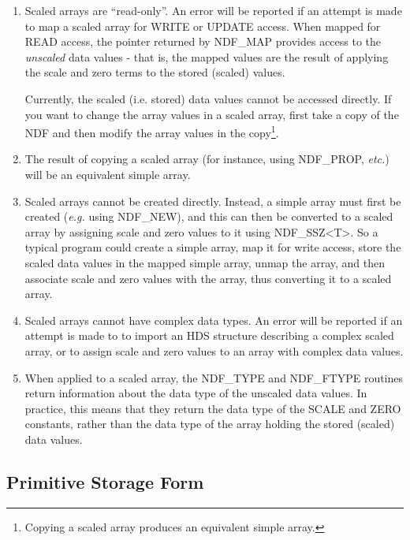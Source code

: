 \begin{enumerate}

\item Scaled arrays are ``read-only''. An error will be reported if an
attempt is made to map a scaled array for WRITE or UPDATE access. When
mapped for READ access, the pointer returned by NDF\_MAP provides access
to the \emph{unscaled} data values - that is, the mapped values are the
result of applying the scale and zero terms to the stored (scaled) values.

Currently, the scaled (i.e. stored) data values cannot be accessed
directly. If you want to change the array values in a scaled array, first
take a copy of the NDF and then modify the array values in the
copy\footnote{Copying a scaled array produces an equivalent simple
array.}.

\item The result of copying a scaled array (for instance, using
NDF\_PROP, \emph{etc.}) will be an equivalent simple array.

\item Scaled arrays cannot be created directly. Instead, a simple array
must first be created (\emph{e.g.} using NDF\_NEW), and this can then be
converted to a scaled array by assigning scale and zero values to it
using NDF\_SSZ<T>. So a typical program could create a simple array, map
it for write access, store the scaled data values in the mapped simple
array, unmap the array, and then associate scale and zero values with the
array, thus converting it to a scaled array.

\item Scaled arrays cannot have complex data types. An error will be
reported if an attempt is made to to import an HDS structure describing a
complex scaled array, or to assign scale and zero values to an array with
complex data values.

\item When applied to a scaled array, the NDF\_TYPE and NDF\_FTYPE routines 
return information about the data type of the unscaled data values. In
practice, this means that they return the data type of the SCALE and ZERO
constants, rather than the data type of the array holding the stored
(scaled) data values.

\end{enumerate}



\subsection{\label{ss:implicitformchange}\label{ss:primitiveform}Primitive Storage Form}

